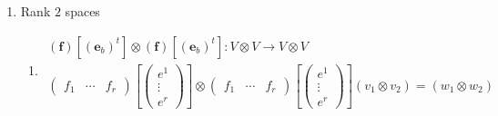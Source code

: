 \documentclass[aps,preprint]{revtex4}
\begin{document}
\begin{enumerate}
\begin{enumerate}
\item 
\begin{gather}
\left( \boldsymbol{f}\right) \left[ \left( \mathbf{e}_{bb}\right) ^{t}\right]
:V^{d}\rightarrow V \\
\left( 
\begin{array}{ccc}
f_{1} & \cdots & f_{r}%
\end{array}%
\right) \left[ \left( 
\begin{array}{c}
e_{bb1} \\ 
\vdots \\ 
e_{bbr}%
\end{array}%
\right) \right] \left( v_{d}\right) =w
\end{gather}

\item 
\begin{gather}
\left( \boldsymbol{f}_{b}\right) \left[ \left( \mathbf{e}_{bb}\right) ^{t}%
\right] :V^{d}\rightarrow V^{d} \\
\left( 
\begin{array}{ccc}
f^{1} & \cdots & f^{r}%
\end{array}%
\right) \left[ \left( 
\begin{array}{c}
e_{bb1} \\ 
\vdots \\ 
e_{bbr}%
\end{array}%
\right) \right] \left( v_{d}\right) =w_{d}
\end{gather}
\end{enumerate}

\item Rank $2$ spaces \label{Rank 2 spaces}

\begin{enumerate}
\item 
\begin{gather}
\left( \boldsymbol{f}\right) \left[ \left( \mathbf{e}_{b}\right) ^{t}\right]
\otimes \left( \boldsymbol{f}\right) \left[ \left( \mathbf{e}_{b}\right) ^{t}%
\right] :V\otimes V\rightarrow V\otimes V \\
\left( 
\begin{array}{ccc}
f_{1} & \cdots & f_{r}%
\end{array}%
\right) \left[ \left( 
\begin{array}{c}
e^{1} \\ 
\vdots \\ 
e^{r}%
\end{array}%
\right) \right] \otimes \left( 
\begin{array}{ccc}
f_{1} & \cdots & f_{r}%
\end{array}%
\right) \left[ \left( 
\begin{array}{c}
e^{1} \\ 
\vdots \\ 
e^{r}%
\end{array}%
\right) \right] \left( v_{1}\otimes v_{2}\right) =\left( w_{1}\otimes
w_{2}\right)
\end{gather}


\end{enumerate}
\end{enumerate}
\end{document}
